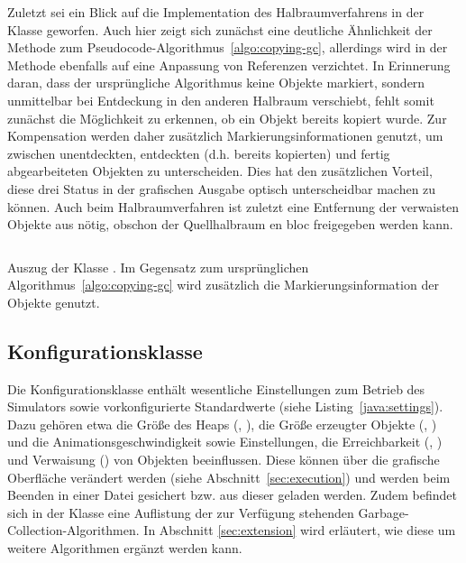 Zuletzt sei ein Blick auf die Implementation des Halbraumverfahrens in der Klasse  geworfen.
Auch hier zeigt sich zunächst eine deutliche Ähnlichkeit der Methode  zum Pseudocode-Algorithmus~\ref{algo:copying-gc}, allerdings wird in der Methode  ebenfalls auf eine Anpassung von Referenzen verzichtet.
In Erinnerung daran, dass der ursprüngliche Algorithmus keine Objekte markiert, sondern unmittelbar bei Entdeckung in den anderen Halbraum verschiebt, fehlt somit zunächst die Möglichkeit zu erkennen, ob ein Objekt bereits kopiert wurde.
Zur Kompensation werden daher zusätzlich Markierungsinformationen genutzt, um zwischen unentdeckten, entdeckten (d.h. bereits kopierten) und fertig abgearbeiteten Objekten zu unterscheiden.
Dies hat den zusätzlichen Vorteil, diese drei Status in der grafischen Ausgabe optisch unterscheidbar machen zu können.
Auch beim Halbraumverfahren ist zuletzt eine Entfernung der verwaisten Objekte aus  nötig, obschon der Quellhalbraum en bloc freigegeben werden kann.

\begin{listing}[h]
	\inputminted[]{java}{code/Semispace-core.java}
	\caption[Auszug der Klasse ]{Auszug der Klasse . Im Gegensatz zum ursprünglichen Algorithmus~\ref{algo:copying-gc} wird zusätzlich die Markierungsinformation der Objekte genutzt.}
	\label{java:semispace-core}
\end{listing}

\subsection{Konfigurationsklasse }
\label{sub:settings}
Die Konfigurationsklasse  enthält wesentliche Einstellungen zum Betrieb des Simulators sowie vorkonfigurierte Standardwerte (siehe Listing~\ref{java:settings}).
Dazu gehören etwa die Größe des Heaps (, ), die Größe erzeugter Objekte (, ) und die Animationsgeschwindigkeit sowie Einstellungen, die Erreichbarkeit (, ) und Verwaisung () von Objekten beeinflussen.
Diese können über die grafische Oberfläche verändert werden (siehe Abschnitt~\ref{sec:execution}) und werden beim Beenden in einer Datei  gesichert bzw. aus dieser geladen werden.
Zudem befindet sich in der Klasse  eine Auflistung der zur Verfügung stehenden Garbage-Collection-Algorithmen.
In Abschnitt \ref{sec:extension} wird erläutert, wie diese um weitere Algorithmen ergänzt werden kann.

